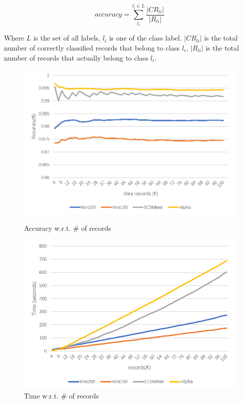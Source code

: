 \documentclass[runningheads]{llncs}
\begin{document}
	\begin{displaymath}
		accuracy= \sum_{l_i}^{l_i \in L} \frac {|CR_{li}|} {|R_{li}|}
	\end{displaymath}
	
	Where $L$ is the set of all labels, $l_i$ is one of the class label. $|CR_{li}|$ is the total number of correctly classified records that belong to class $l_i$, $|R_{li}|$ is the total number of records that actually belong to class $l_i$.
	
	\begin{figure}
		\centering
		\begin{minipage}[t]{0.46\textwidth}
			\centering
			\includegraphics[width=1.0\textwidth]{figure-accuracy}
			\caption{Accuracy w.r.t. \# of records}
			\label{fig:accuracy}
		\end{minipage}
		\hspace{3mm}
		\begin{minipage}[t]{0.46\textwidth}
			\centering
			\includegraphics[width=1.0\textwidth]{figure-time}
			\caption{Time w.r.t. \# of records}
			\label{fig:time}
		\end{minipage}%
	\end{figure}
	
\end{document}
